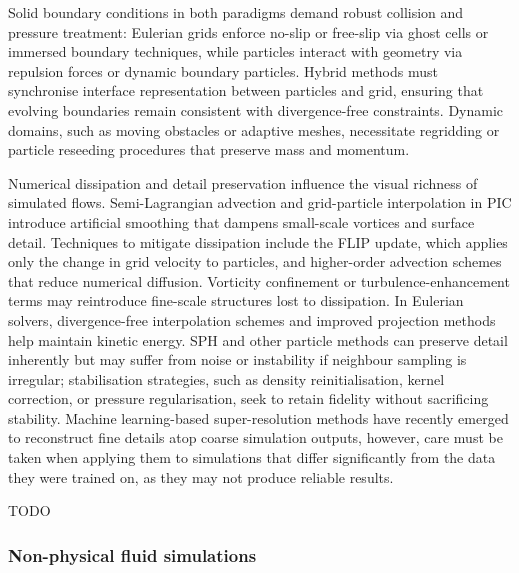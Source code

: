Solid boundary conditions in both paradigms demand robust collision and pressure treatment: Eulerian grids enforce no-slip or free-slip via ghost cells or immersed boundary techniques, while particles interact with geometry via repulsion forces or dynamic boundary particles. Hybrid methods must synchronise interface representation between particles and grid, ensuring that evolving boundaries remain consistent with divergence-free constraints. Dynamic domains, such as moving obstacles or adaptive meshes, necessitate regridding or particle reseeding procedures that preserve mass and momentum.


Numerical dissipation and detail preservation influence the visual richness of simulated flows. Semi-Lagrangian advection and grid-particle interpolation in PIC introduce artificial smoothing that dampens small-scale vortices and surface detail. Techniques to mitigate dissipation include the FLIP update, which applies only the change in grid velocity to particles, and higher-order advection schemes that reduce numerical diffusion. Vorticity confinement or turbulence-enhancement terms may reintroduce fine-scale structures lost to dissipation. In Eulerian solvers, divergence-free interpolation schemes and improved projection methods help maintain kinetic energy. SPH and other particle methods can preserve detail inherently but may suffer from noise or instability if neighbour sampling is irregular; stabilisation strategies, such as density reinitialisation, kernel correction, or pressure regularisation, seek to retain fidelity without sacrificing stability. Machine learning-based super-resolution methods have recently emerged to reconstruct fine details atop coarse simulation outputs, however, care must be taken when applying them to simulations that differ significantly from the data they were trained on, as they may not produce reliable results.

\midConclusion

TODO


\subsubsection{Non-physical fluid simulations}

    
